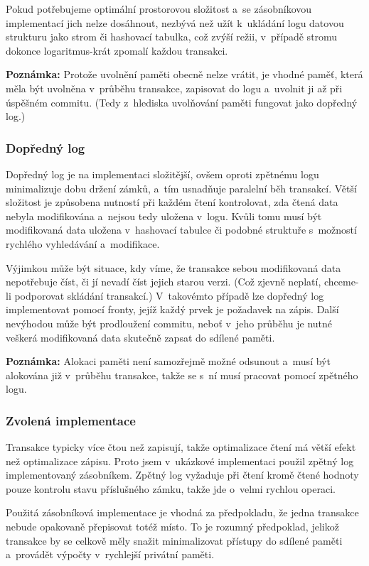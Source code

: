 Pokud potřebujeme optimální prostorovou složitost a~se zásobníkovou implementací
jich nelze dosáhnout, nezbývá než užít k~ukládání logu datovou strukturu jako
strom či hashovací tabulka, což zvýší režii, v~případě stromu dokonce logaritmus-krát
zpomalí každou transakci.

\textbf{Poznámka:} Protože uvolnění paměti obecně nelze vrátit, je vhodné paměť,
která měla
být uvolněna v~průběhu transakce, zapisovat do logu a~uvolnit ji až při úspěšném
commitu. (Tedy z~hlediska uvolňování paměti fungovat jako dopředný log.)

\subsubsection*{Dopředný log}
Dopředný log je na implementaci složitější, ovšem oproti zpětnému logu minimalizuje
dobu držení zámků, a~tím usnadňuje paralelní běh transakcí. Větší složitost je
způsobena nutností při každém čtení kontrolovat, zda čtená data nebyla modifikována
a~nejsou tedy uložena v~logu. Kvůli tomu musí být modifikovaná data
uložena v~hashovací tabulce či podobné struktuře s~možností rychlého vyhledávání
a~modifikace.

Výjimkou může být situace, kdy víme, že transakce sebou modifikovaná
data nepotřebuje číst, či jí nevadí číst jejich starou verzi.
(Což zjevně neplatí, chceme-li podporovat skládání transakcí.)
V~takovémto případě lze dopředný log
implementovat pomocí fronty, jejíž každý prvek je požadavek na zápis.
Další nevýhodou může být prodloužení commitu, neboť v~jeho průběhu je nutné
veškerá modifikovaná data skutečně zapsat do sdílené paměti.

\textbf{Poznámka:} Alokaci paměti není samozřejmě možné odsunout a~musí být alokována
již v~průběhu transakce, takže se s~ní musí pracovat pomocí zpětného logu.

\subsubsection*{Zvolená implementace}
Transakce typicky více čtou než zapisují,
takže optimalizace čtení má větší efekt než optimalizace zápisu.
Proto jsem v~ukázkové implementaci použil zpětný log implementovaný zásobníkem.
Zpětný log vyžaduje při čtení kromě čtené hodnoty pouze kontrolu stavu příslušného
zámku, takže jde o~velmi rychlou operaci.

Použitá zásobníková
implementace je vhodná za předpokladu, že jedna transakce nebude opakovaně přepisovat
totéž místo. To je rozumný předpoklad, jelikož transakce by se celkově měly snažit
minimalizovat přístupy do sdílené paměti a~provádět výpočty v~rychlejší privátní
paměti.

